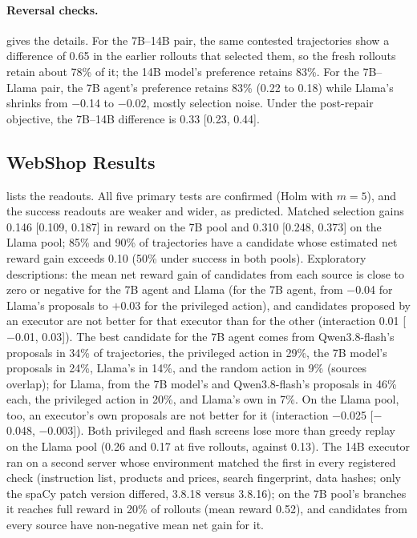 \documentclass{article}
\theoremstyle{plain}
\theoremstyle{definition}
\theoremstyle{remark}
\begin{document}
\paragraph{Reversal checks.}
 gives the details. For the 7B--14B pair, the same contested trajectories show a difference of 0.65 in the earlier rollouts that selected them, so the fresh rollouts retain about 78\% of it; the 14B model's preference retains 83\%. For the 7B--Llama pair, the 7B agent's preference retains 83\% (0.22 to 0.18) while Llama's shrinks from $-$0.14 to $-$0.02, mostly selection noise. Under the post-repair objective, the 7B--14B difference is 0.33 [0.23, 0.44].

\subsection{WebShop Results}
\label{app:webshopres}

 lists the readouts. All five primary tests are confirmed (Holm with $m=5$), and the success readouts are weaker and wider, as predicted. Matched selection gains 0.146 [0.109, 0.187] in reward on the 7B pool and 0.310 [0.248, 0.373] on the Llama pool; 85\% and 90\% of trajectories have a candidate whose estimated net reward gain exceeds 0.10 (50\% under success in both pools). Exploratory descriptions: the mean net reward gain of candidates from each source is close to zero or negative for the 7B agent and Llama (for the 7B agent, from $-$0.04 for Llama's proposals to $+$0.03 for the privileged action), and candidates proposed by an executor are not better for that executor than for the other (interaction 0.01 [$-$0.01, 0.03]). The best candidate for the 7B agent comes from Qwen3.8-flash's proposals in 34\% of trajectories, the privileged action in 29\%, the 7B model's proposals in 24\%, Llama's in 14\%, and the random action in 9\% (sources overlap); for Llama, from the 7B model's and Qwen3.8-flash's proposals in 46\% each, the privileged action in 20\%, and Llama's own in 7\%. On the Llama pool, too, an executor's own proposals are not better for it (interaction $-$0.025 [$-$0.048, $-$0.003]). Both privileged and flash screens lose more than greedy replay on the Llama pool (0.26 and 0.17 at five rollouts, against 0.13). The 14B executor ran on a second server whose environment matched the first in every registered check (instruction list, products and prices, search fingerprint, data hashes; only the spaCy patch version differed, 3.8.18 versus 3.8.16); on the 7B pool's branches it reaches full reward in 20\% of rollouts (mean reward 0.52), and candidates from every source have non-negative mean net gain for it.
\end{document}
